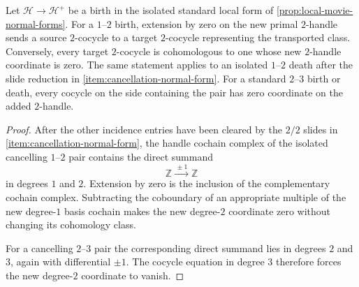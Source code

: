 \begin{lemma}
\label{lem:cancellation-cochain-normal-forms}
Let \(\mathcal H\to\mathcal H^+\) be a birth in the isolated standard local
form of \cref{prop:local-movie-normal-forms}.  For a $1$--$2$ birth,
extension by zero on the new primal $2$-handle sends a source $2$-cocycle
to a target $2$-cocycle representing the transported class.  Conversely,
every target $2$-cocycle is cohomologous to one whose new $2$-handle
coordinate is zero.  The same statement applies to an isolated $1$--$2$
death after the slide reduction in \cref{item:cancellation-normal-form}.
For a standard $2$--$3$ birth or death, every cocycle on the side containing
the pair has zero coordinate on the added $2$-handle.
\end{lemma}

\begin{proof}
After the other incidence entries have been cleared by the $2/2$ slides in
\cref{item:cancellation-normal-form}, the handle cochain complex of the
isolated cancelling $1$--$2$ pair contains the direct summand
\[
  \mathbb Z\xrightarrow{\,\pm1\,}\mathbb Z
\]
in degrees $1$ and $2$.  Extension by zero is the inclusion of the
complementary cochain complex.  Subtracting the coboundary of an appropriate
multiple of the new degree-$1$ basis cochain makes the new degree-$2$
coordinate zero without changing its cohomology class.

For a cancelling $2$--$3$ pair the corresponding direct summand lies in
degrees $2$ and $3$, again with differential $\pm1$.  The cocycle equation
in degree $3$ therefore forces the new degree-$2$ coordinate to vanish.
\end{proof}
